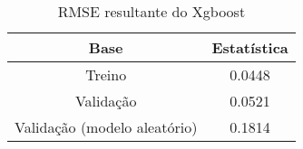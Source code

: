 
\begin{table}[h]
\centering
\caption{RMSE resultante do Xgboost}
\label{tab:cap3_rmse_xgboost}
\begin{tabular}{cc}
Base & Estatística \\
\hline
Treino & 0.0448 \\
Validação & 0.0521 \\
Validação (modelo aleatório) & 0.1814 \\
\hline
\end{tabular}

\end{table}
